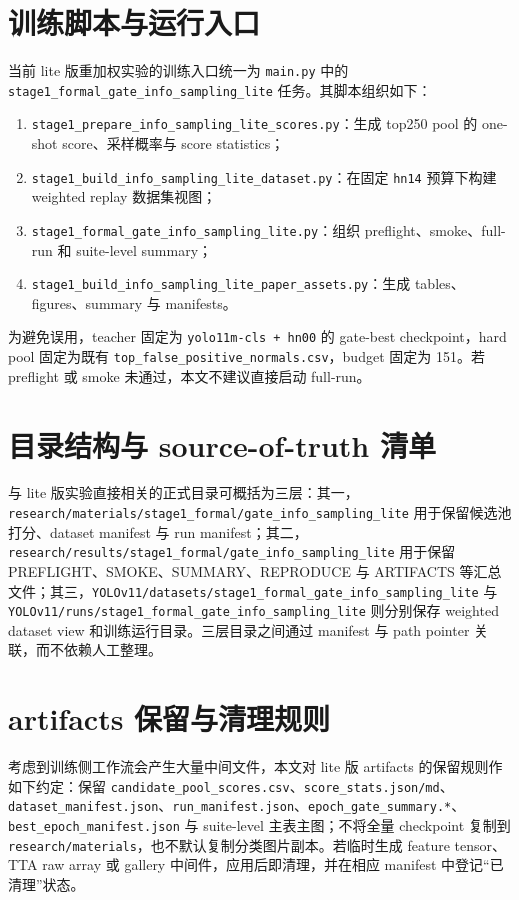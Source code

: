 \documentclass[UTF8,openany,12pt]{ctexbook}
\begin{document}
\section{训练脚本与运行入口}
当前 lite 版重加权实验的训练入口统一为 \texttt{main.py} 中的 \texttt{stage1\_formal\_gate\_info\_sampling\_lite} 任务。其脚本组织如下：
\begin{enumerate}[label=\arabic*.]
    \item \texttt{stage1\_prepare\_info\_sampling\_lite\_scores.py}：生成 top250 pool 的 one-shot score、采样概率与 score statistics；
    \item \texttt{stage1\_build\_info\_sampling\_lite\_dataset.py}：在固定 \texttt{hn14} 预算下构建 weighted replay 数据集视图；
    \item \texttt{stage1\_formal\_gate\_info\_sampling\_lite.py}：组织 preflight、smoke、full-run 和 suite-level summary；
    \item \texttt{stage1\_build\_info\_sampling\_lite\_paper\_assets.py}：生成 tables、figures、summary 与 manifests。
\end{enumerate}
为避免误用，teacher 固定为 \texttt{yolo11m-cls + hn00} 的 gate-best checkpoint，hard pool 固定为既有 \texttt{top\_false\_positive\_normals.csv}，budget 固定为 151。若 preflight 或 smoke 未通过，本文不建议直接启动 full-run。

\section{目录结构与 source-of-truth 清单}
与 lite 版实验直接相关的正式目录可概括为三层：其一，\texttt{research/materials/stage1\_formal/gate\_info\_sampling\_lite} 用于保留候选池打分、dataset manifest 与 run manifest；其二，\texttt{research/results/stage1\_formal/gate\_info\_sampling\_lite} 用于保留 PREFLIGHT、SMOKE、SUMMARY、REPRODUCE 与 ARTIFACTS 等汇总文件；其三，\texttt{YOLOv11/datasets/stage1\_formal\_gate\_info\_sampling\_lite} 与 \texttt{YOLOv11/runs/stage1\_formal\_gate\_info\_sampling\_lite} 则分别保存 weighted dataset view 和训练运行目录。三层目录之间通过 manifest 与 path pointer 关联，而不依赖人工整理。

\section{artifacts 保留与清理规则}
考虑到训练侧工作流会产生大量中间文件，本文对 lite 版 artifacts 的保留规则作如下约定：保留 \texttt{candidate\_pool\_scores.csv}、\texttt{score\_stats.json/md}、\texttt{dataset\_manifest.json}、\texttt{run\_manifest.json}、\texttt{epoch\_gate\_summary.*}、\texttt{best\_epoch\_manifest.json} 与 suite-level 主表主图；不将全量 checkpoint 复制到 \texttt{research/materials}，也不默认复制分类图片副本。若临时生成 feature tensor、TTA raw array 或 gallery 中间件，应用后即清理，并在相应 manifest 中登记“已清理”状态。
\end{document}
